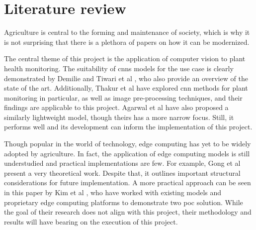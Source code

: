 \documentclass{report}
\begin{document}
	\chapter{Literature review}	
	Agriculture is central to the forming and maintenance of society, which is why it is not surprising that there is a plethora of papers on how it can be modernized. 
	
	The central theme of this project is the application of computer vision to plant health monitoring. The suitability of \glspl{cnn} models for the use case is clearly demonstrated by Demilie \cite{demilie2024plant} and Tiwari et al \cite{tiwari2021dense}, who also provide an overview of the state of the art. Additionally, Thakur et al \cite{thakur2023vgg} have explored \gls{cnn} methods for plant monitoring in particular, as well as image pre-processing techniques, and their findings are applicable to this project. Agarwal et al \cite{agarwal2020development} have also proposed a similarly lightweight model, though theirs has a more narrow focus. Still, it performs well and its development can inform the implementation of this project. 
	
	Though popular in the world of technology, edge computing has yet to be widely adopted by agriculture. In fact, the application of edge computing models is still understudied and practical implementations are few. For example, Gong et al \cite{gong2025edge} present a very theoretical work. Despite that, it outlines important structural considerations for future implementation. A more practical approach can be seen in this paper by Kim et al \cite{kim2025real}, who have worked with existing models and proprietary edge computing platforms to demonstrate two \gls{poc} solution. While the goal of their research does not align with this project, their methodology and results will have bearing on the execution of this project.
	
	\printglossary[type=\acronymtype]
	\printbibliography
	
\end{document}
